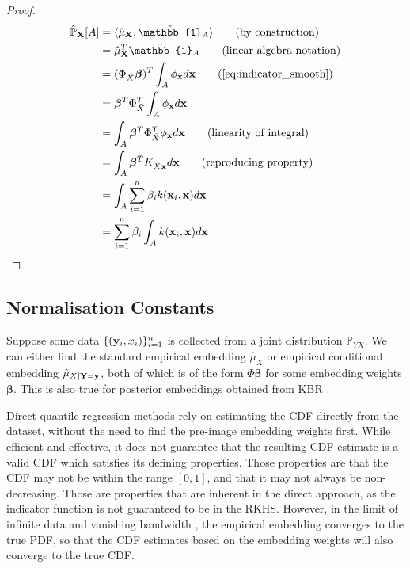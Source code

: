 \documentclass[twoside]{article} \usepackage{aistats2017}
\theoremstyle{definition}
\theoremstyle{theorem}
\newcommand{\rv}[1]{{#1}}
\newcommand{\ds}[1]{\tilde{#1}}
\newcommand{\inner}[2]{{\langle #1, #2 \rangle}}
\begin{document}
		\begin{proof}
			\begin{align*}
					\hat{\mathbb{P}}_{\bvec{\rv{X}}}[A] &= \inner{\hat{\mu}_{\bvec{\rv{X}}}}{\tilde{\mathbb{1}}_{A}} \tag{by construction} \\
					&= \hat{\mu}_{\bvec{\rv{X}}}^{T} \tilde{\mathbb{1}}_{A} \tag{linear algebra notation} \\
					&= (\Phi_{\ds{X}} \bm{\beta})^{T} \int_{A} \phi_{\bvec{x}} d\bvec{x} \tag{\cref{eq:indicator_smooth}} \\
					&= \bm{\beta}^{T} \Phi_{\ds{X}}^{T} \int_{A} \phi_{\bvec{x}} d\bvec{x} \\
					&= \int_{A} \bm{\beta}^{T} \Phi_{\ds{X}}^{T} \phi_{\bvec{x}} d\bvec{x} \tag{linearity of integral} \\
					&= \int_{A} \bm{\beta}^{T} K_{\ds{X} \bvec{x}} d\bvec{x} \tag{reproducing property} \\
					&= \int_{A} \sum_{i = 1}^{n} \beta_{i} k(\bvec{x}_{i}, \bvec{x}) d\bvec{x} \\
					&= \sum_{i = 1}^{n} \beta_{i} \int_{A}  k(\bvec{x}_{i}, \bvec{x}) d\bvec{x} \\
			\end{align*}
		\end{proof}
		
	\subsection{Normalisation Constants}
	\label{sec:direct_quantile_regression:normalisation_constants}
	
		Suppose some data $\{(\mathbf{y}_{i}, x_{i})\}_{i = 1}^{n}$ is collected from a joint distribution $\mathbb{P}_{\rv{Y} \rv{X}}$. We can either find the standard empirical embedding $\hat{\mu}_{\rv{X}}$ or empirical conditional embedding $\hat{\mu}_{\rv{X} | \bvec{\rv{Y}} = \bvec{y}}$, both of which is of the form $\Phi \bm{\beta}$ for some embedding weights $\bm{\beta}$. This is also true for posterior embeddings obtained from KBR \citep{fukumizu2013kernel}.
		
		Direct quantile regression methods rely on estimating the CDF directly from the dataset, without the need to find the pre-image embedding weights first. While efficient and effective, it does not guarantee that the resulting CDF estimate is a valid CDF which satisfies its defining properties. Those properties are that the CDF may not be within the range $[0, 1]$, and that it may not always be non-decreasing. Those are properties that are inherent in the direct approach, as the indicator function is not guaranteed to be in the RKHS. However, in the limit of infinite data and vanishing bandwidth \citep{kanagawa2016filtering}, the empirical embedding converges to the true PDF, so that the CDF estimates based on the embedding weights will also converge to the true CDF.
		
\end{document}
